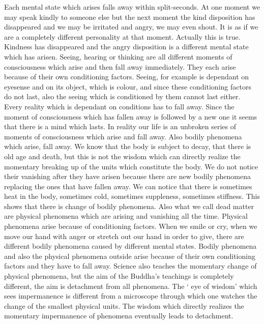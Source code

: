 \documentclass{book}
\begin{document}
Each mental state which arises falls away within split-seconds. At one
moment we may speak kindly to someone else but the next moment the kind
disposition has disappeared and we may be irritated and angry, we may
even shout. It is as if we are a completely different personality at
that moment. Actually this is true. Kindness has disappeared and the
angry disposition is a different mental state which has arisen. Seeing,
hearing or thinking are all different moments of consciousness which
arise and then fall away immediately. They each arise because of their
own conditioning factors. Seeing, for example is dependant on eyesense
and on its object, which is colour, and since these conditioning factors
do not last, also the seeing which is conditioned by them cannot last
either. Every reality which is dependant on conditions has to fall away.
Since the moment of consciousness which has fallen away is followed by a
new one it seems that there is a mind which lasts. In reality our life
is an unbroken series of moments of consciousness which arise and fall
away. Also bodily phenomena which arise, fall away. We know that the
body is subject to decay, that there is old age and death, but this is
not the wisdom which can directly realize the momentary breaking up of
the units which constitute the body. We do not notice their vanishing
after they have arisen because there are new bodily phenomena replacing
the ones that have fallen away. We can notice that there is sometimes
heat in the body, sometimes cold, sometimes suppleness, sometimes
stiffness. This shows that there is change of bodily phenomena. Also
what we call dead matter are physical phenomena which are arising and
vanishing all the time. Physical phenomena arise because of conditioning
factors. When we smile or cry, when we move our hand with anger or
stretch out our hand in order to give, there are different bodily
phenomena caused by different mental states. Bodily phenomena and also
the physical phenomena outside arise because of their own conditioning
factors and they have to fall away. Science also teaches the momentary
change of physical phenomena, but the aim of the Buddha's teachings is
completely different, the aim is detachment from all phe­nomena. The `
eye of wisdom' which sees impermanence is different from a microscope
through which one watches the change of the smallest physical units. The
wisdom which directly realizes the momentary impermanence of phenomena
eventually leads to detachment.
\end{document}
